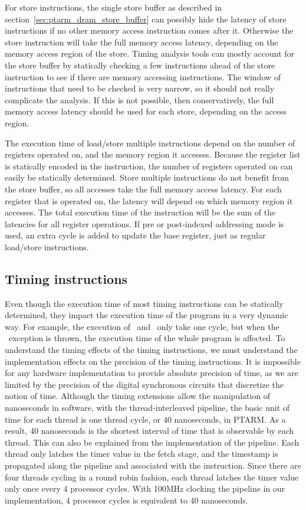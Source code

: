 For store instructions, the single store buffer as described in section~\ref{sec:ptarm_dram_store_buffer} can possibly hide the latency of store instructions if no other memory access instruction comes after it. 
Otherwise the store instruction will take the full memory access latency, depending on the memory access region of the store.
Timing analysis tools can mostly account for the store buffer by statically checking a few instructions ahead of the store instruction to see if there are memory accessing instructions.
The window of instructions that need to be checked is very narrow, so it should not really complicate the analysis.
If this is not possible, then conservatively, the full memory access latency should be used for each store, depending on the access region.

The execution time of load/store multiple instructions depend on the number of registers operated on, and the memory region it accesses. 
Because the register list is statically encoded in the instruction, the number of registers operated on can easily be statically determined.
Store multiple instructions do not benefit from the store buffer, so all accesses take the full memory access latency.
For each register that is operated on, the latency will depend on which memory region it accesses. 
The total execution time of the instruction will be the sum of the latencies for all register operations. 
If pre or post-indexed addressing mode is used, an extra cycle is added to update the base register, just as regular load/store instructions. 

\subsection{Timing instructions}
Even though the execution time of most timing instructions can be statically determined, they impact the execution time of the program in a very dynamic way.
For example, the execution of \exceptiononexpire\ and \deactivateexception\ only take one cycle, but when the \timerexpired\ exception is thrown, the execution time of the whole program is affected. 
To understand the timing effects of the timing instructions, we must understand the implementation effects on the precision of the timing instructions.
It is impossible for any hardware implementation to provide absolute precision of time, as we are limited by the precision of the digital synchronous circuits that discretize the notion of time. 
Although the timing extensions allow the manipulation of nanoseconds in software, with the thread-interleaved pipeline, the basic unit of time for each thread is one thread cycle, or 40 nanoseconds, in PTARM.
As a result, 40 nanoseconds is the shortest interval of time that is observable by each thread.
This can also be explained from the implementation of the pipeline.
Each thread only latches the timer value in the fetch stage, and the timestamp is propagated along the pipeline and associated with the instruction. 
Since there are four threads cycling in a round robin fashion, each thread latches the timer value only once every 4 processor cycles. 
With 100MHz clocking the pipeline in our implementation, 4 processor cycles is  equivalent to 40 nanoseconds. 

